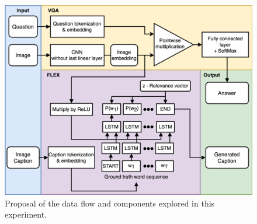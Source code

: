         
        \begin{figure}[htb]
            \centering
            
            \includegraphics[width=\linewidth]{images/architecture_proposal.png}
            \caption{Proposal of the data flow and components explored in this experiment.
            }
            \label{fig:architecture_proposal}
        \end{figure}
                
                
        

        
        
